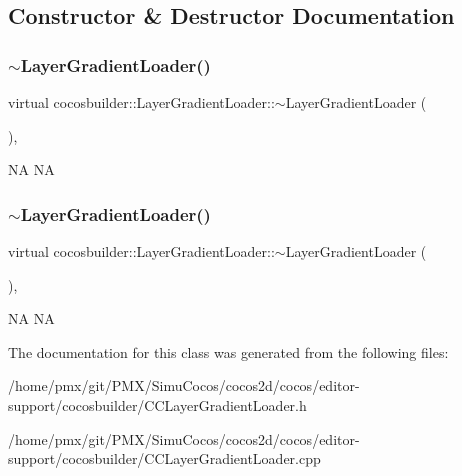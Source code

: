 \subsection{Constructor \& Destructor Documentation}
\mbox{\label{classcocosbuilder_1_1LayerGradientLoader_aa8e020a5c3f0e6f06df6e971b1a1a24c}} 
\subsubsection{\texorpdfstring{$\sim$\+Layer\+Gradient\+Loader()}{~LayerGradientLoader()}\hspace{0.1cm}{\footnotesize\ttfamily [1/2]}}
{\footnotesize\ttfamily virtual cocosbuilder\+::\+Layer\+Gradient\+Loader\+::$\sim$\+Layer\+Gradient\+Loader (\begin{DoxyParamCaption}{ }\end{DoxyParamCaption})\hspace{0.3cm}{\ttfamily [inline]}, {\ttfamily [virtual]}}

NA  NA \mbox{\label{classcocosbuilder_1_1LayerGradientLoader_aa8e020a5c3f0e6f06df6e971b1a1a24c}} 
\subsubsection{\texorpdfstring{$\sim$\+Layer\+Gradient\+Loader()}{~LayerGradientLoader()}\hspace{0.1cm}{\footnotesize\ttfamily [2/2]}}
{\footnotesize\ttfamily virtual cocosbuilder\+::\+Layer\+Gradient\+Loader\+::$\sim$\+Layer\+Gradient\+Loader (\begin{DoxyParamCaption}{ }\end{DoxyParamCaption})\hspace{0.3cm}{\ttfamily [inline]}, {\ttfamily [virtual]}}

NA  NA 

The documentation for this class was generated from the following files\+:\begin{DoxyCompactItemize}
\item 
/home/pmx/git/\+P\+M\+X/\+Simu\+Cocos/cocos2d/cocos/editor-\/support/cocosbuilder/C\+C\+Layer\+Gradient\+Loader.\+h\item 
/home/pmx/git/\+P\+M\+X/\+Simu\+Cocos/cocos2d/cocos/editor-\/support/cocosbuilder/C\+C\+Layer\+Gradient\+Loader.\+cpp\end{DoxyCompactItemize}
